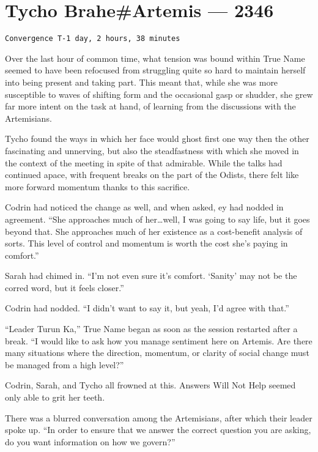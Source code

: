 \hypertarget{tycho-braheartemis-2346}{%
\chapter{Tycho Brahe\#Artemis — 2346}\label{tycho-braheartemis-2346}}

\begin{verbatim}
Convergence T-1 day, 2 hours, 38 minutes
\end{verbatim}

Over the last hour of common time, what tension was bound within True Name seemed to have been refocused from struggling quite so hard to maintain herself into being present and taking part. This meant that, while she was more susceptible to waves of shifting form and the occasional gasp or shudder, she grew far more intent on the task at hand, of learning from the discussions with the Artemisians.

Tycho found the ways in which her face would ghost first one way then the other fascinating and unnerving, but also the steadfastness with which she moved in the context of the meeting in spite of that admirable. While the talks had continued apace, with frequent breaks on the part of the Odists, there felt like more forward momentum thanks to this sacrifice.

Codrin had noticed the change as well, and when asked, ey had nodded in agreement. ``She approaches much of her\ldots well, I was going to say life, but it goes beyond that. She approaches much of her existence as a cost-benefit analysis of sorts. This level of control and momentum is worth the cost she's paying in comfort.''

Sarah had chimed in. ``I'm not even sure it's comfort. `Sanity' may not be the corred word, but it feels closer.''

Codrin had nodded. ``I didn't want to say it, but yeah, I'd agree with that.''

``Leader Turun Ka,'' True Name began as soon as the session restarted after a break. ``I would like to ask how you manage sentiment here on Artemis. Are there many situations where the direction, momentum, or clarity of social change must be managed from a high level?''

Codrin, Sarah, and Tycho all frowned at this. Answers Will Not Help seemed only able to grit her teeth.

There was a blurred conversation among the Artemisians, after which their leader spoke up. ``In order to ensure that we answer the correct question you are asking, do you want information on how we govern?''

